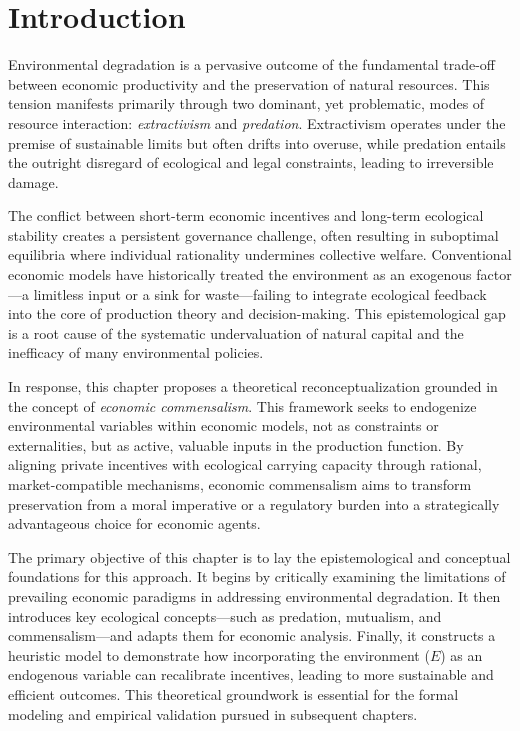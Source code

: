 \section{Introduction}

Environmental degradation is a pervasive outcome of the fundamental trade-off between economic productivity and the preservation of natural resources. This tension manifests primarily through two dominant, yet problematic, modes of resource interaction: \emph{extractivism} and \emph{predation}. Extractivism operates under the premise of sustainable limits but often drifts into overuse, while predation entails the outright disregard of ecological and legal constraints, leading to irreversible damage.

The conflict between short-term economic incentives and long-term ecological stability creates a persistent governance challenge, often resulting in suboptimal equilibria where individual rationality undermines collective welfare. Conventional economic models have historically treated the environment as an exogenous factor—a limitless input or a sink for waste—failing to integrate ecological feedback into the core of production theory and decision-making. This epistemological gap is a root cause of the systematic undervaluation of natural capital and the inefficacy of many environmental policies.

In response, this chapter proposes a theoretical reconceptualization grounded in the concept of \emph{economic commensalism}. This framework seeks to endogenize environmental variables within economic models, not as constraints or externalities, but as active, valuable inputs in the production function. By aligning private incentives with ecological carrying capacity through rational, market-compatible mechanisms, economic commensalism aims to transform preservation from a moral imperative or a regulatory burden into a strategically advantageous choice for economic agents.

The primary objective of this chapter is to lay the epistemological and conceptual foundations for this approach. It begins by critically examining the limitations of prevailing economic paradigms in addressing environmental degradation. It then introduces key ecological concepts—such as predation, mutualism, and commensalism—and adapts them for economic analysis. Finally, it constructs a heuristic model to demonstrate how incorporating the environment (\(E\)) as an endogenous variable can recalibrate incentives, leading to more sustainable and efficient outcomes. This theoretical groundwork is essential for the formal modeling and empirical validation pursued in subsequent chapters.

